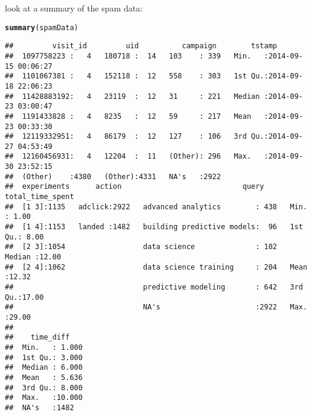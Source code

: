 \documentclass{article}\usepackage[]{graphicx}\usepackage[]{color}
\makeatletter
\newcommand{\hlstd}[1]{\textcolor[rgb]{0.345,0.345,0.345}{#1}}%
\newcommand{\hlkwd}[1]{\textcolor[rgb]{0.737,0.353,0.396}{\textbf{#1}}}%
\newenvironment{kframe}{%
 \def\at@end@of@kframe{}%
 \ifinner\ifhmode%
  \def\at@end@of@kframe{\end{minipage}}%
  \begin{minipage}{\columnwidth}%
 \fi\fi%
 \def\FrameCommand##1{\hskip\@totalleftmargin \hskip-\fboxsep
 \colorbox{shadecolor}{##1}\hskip-\fboxsep
     \hskip-\linewidth \hskip-\@totalleftmargin \hskip\columnwidth}%
 \MakeFramed {\advance\hsize-\width
   \@totalleftmargin\z@ \linewidth\hsize
   \@setminipage}}%
 {\par\unskip\endMakeFramed%
 \at@end@of@kframe}
\newenvironment{knitrout}{}{} %
\makeatother
\begin{document}
look at a summary of the spam data:
\begin{knitrout}
\color{fgcolor}\begin{kframe}
\begin{alltt}
\hlkwd{summary}\hlstd{(spamData)}
\end{alltt}
\begin{verbatim}
##         visit_id         uid          campaign        tstamp                   
##  1097758223 :   4   180718 :  14   103    : 339   Min.   :2014-09-15 00:06:27  
##  1101067381 :   4   152118 :  12   558    : 303   1st Qu.:2014-09-18 22:06:23  
##  11428883192:   4   23119  :  12   31     : 221   Median :2014-09-23 03:00:47  
##  1191433828 :   4   8235   :  12   59     : 217   Mean   :2014-09-23 00:33:30  
##  12119332951:   4   86179  :  12   127    : 106   3rd Qu.:2014-09-27 04:53:49  
##  12160456931:   4   12204  :  11   (Other): 296   Max.   :2014-09-30 23:52:15  
##  (Other)    :4380   (Other):4331   NA's   :2922                                
##  experiments      action                            query      total_time_spent
##  [1 3]:1135   adclick:2922   advanced analytics        : 438   Min.   : 1.00   
##  [1 4]:1153   landed :1482   building predictive models:  96   1st Qu.: 8.00   
##  [2 3]:1054                  data science              : 102   Median :12.00   
##  [2 4]:1062                  data science training     : 204   Mean   :12.32   
##                              predictive modeling       : 642   3rd Qu.:17.00   
##                              NA's                      :2922   Max.   :29.00   
##                                                                                
##    time_diff     
##  Min.   : 1.000  
##  1st Qu.: 3.000  
##  Median : 6.000  
##  Mean   : 5.636  
##  3rd Qu.: 8.000  
##  Max.   :10.000  
##  NA's   :1482
\end{verbatim}
\end{kframe}
\end{knitrout}
\end{document}

